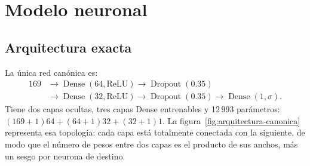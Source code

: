 \section{Modelo neuronal}\label{sec:modelo}

\subsection{Arquitectura exacta}
La única red canónica es:
\begin{align*}
169 &\rightarrow \operatorname{Dense}(64,\mathrm{ReLU})
\rightarrow \operatorname{Dropout}(0.35)\\
&\rightarrow \operatorname{Dense}(32,\mathrm{ReLU})
\rightarrow \operatorname{Dropout}(0.35)
\rightarrow \operatorname{Dense}(1,\sigma).
\end{align*}
Tiene dos capas ocultas, tres capas Dense entrenables y 12\,993 parámetros: $(169+1)64+(64+1)32+(32+1)1$. La figura~\ref{fig:arquitectura-canonica} representa esa topología: cada capa está totalmente conectada con la siguiente, de modo que el número de pesos entre dos capas es el producto de sus anchos, más un sesgo por neurona de destino.

